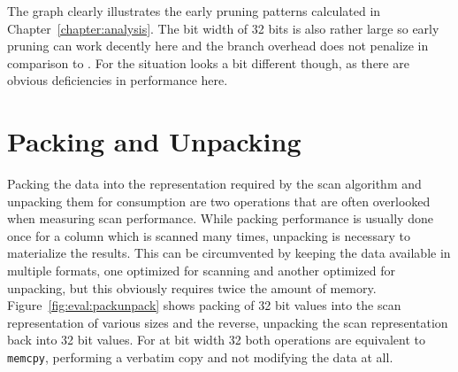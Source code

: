 The graph clearly illustrates the early pruning patterns calculated in
Chapter~\ref{chapter:analysis}. The bit width of 32 bits is also rather large so
early pruning can work decently here and the branch overhead does not penalize
\bwv{} in comparison to \simdscan{}. For \bs{} the situation looks a bit
different though, as there are obvious deficiencies in performance here.

\section{Packing and Unpacking}

Packing the data into the representation required by the scan algorithm and
unpacking them for consumption are two operations that are often overlooked when
measuring scan performance. While packing performance is usually done once for a
column which is scanned many times, unpacking is necessary to materialize the
results. This can be circumvented by keeping the data available in multiple
formats, one optimized for scanning and another optimized for unpacking, but
this obviously requires twice the amount of memory.
Figure~\ref{fig:eval:packunpack} shows packing of 32 bit values into the scan
representation of various sizes and the reverse, unpacking the scan
representation back into 32 bit values. For \simdscan{} at bit width 32 both
operations are equivalent to \texttt{memcpy}, performing a verbatim copy and not
modifying the data at all.

